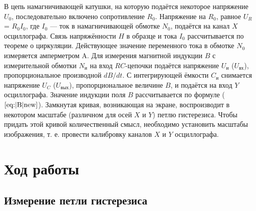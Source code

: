 \documentclass[11pt]{article}
\begin{document}
В цепь намагничивающей катушки, на которую подаётся некоторое
напряжение $U_0$, последовательно включено сопротивление $R_0$. Напряжение на $R_0$, равное $U_R$= $R_0I_0$, где $I_0$ — ток в намагничивающей обмотке $N_0$, подаётся на канал $ X $ осциллографа. Связь напряжённости $ H $ в
образце и тока $I_0$ рассчитывается по теореме о циркуляции. 
Действующее значение переменного тока в обмотке $N_0$ измеряется амперметром A.
Для измерения магнитной индукции $ B $ с измерительной обмотки $N_\text{и}$
на вход $ RC $-цепочки подаётся напряжение $U_\text{и}$ ($U_{\text{вх}}$), пропорциональное
производной $ dB/dt $. С интегрирующей ёмкости $C_\text{и}$ снимается напряжение $U_C$ ($U_{\text{вых}}$), пропорциональное величине $ B $, и подаётся на вход $ Y $
осциллографа. Значение индукции поля $ B $ рассчитывается по формуле ($\ref{eq:|B|new}$).
Замкнутая кривая, возникающая на экране, воспроизводит в некотором масштабе (различном для осей $ X $ и $ Y $) петлю гистерезиса. Чтобы придать этой кривой количественный смысл, необходимо установить
масштабы изображения, т. е. провести калибровку каналов $ X $ и $ Y $ осциллографа.



\section{Ход работы}

\subsection{Измерение петли гистерезиса}
\end{document}
